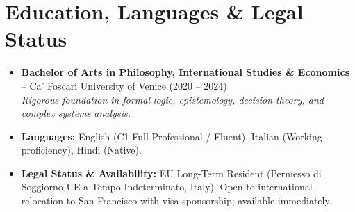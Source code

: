 \documentclass[a4paper,10pt]{article}
\begin{document}
\section{Education, Languages \& Legal Status}
\begin{itemize}
  \item \textbf{Bachelor of Arts in Philosophy, International Studies \& Economics} -- Ca' Foscari University of Venice (2020 -- 2024) \\
  \textit{Rigorous foundation in formal logic, epistemology, decision theory, and complex systems analysis.}
  \item \textbf{Languages:} English (C1 Full Professional / Fluent), Italian (Working proficiency), Hindi (Native).
  \item \textbf{Legal Status \& Availability:} EU Long-Term Resident (Permesso di Soggiorno UE a Tempo Indeterminato, Italy). Open to international relocation to San Francisco with visa sponsorship; available immediately.
\end{itemize}
\end{document}
